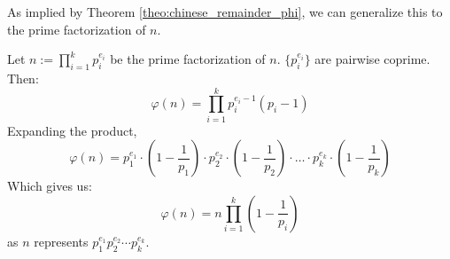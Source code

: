 \noindent
As implied by Theorem \ref{theo:chinese_remainder_phi}, we can generalize this to the prime factorization of $n$.
\begin{theo}

    Let $n:=\prod_{i=1}^k p_i^{e_i}$ be the prime factorization of $n$. $\{p_{i}^{e_i}\}$ are pairwise coprime. Then:
    \[\varphi(n)=\prod_{i=1}^k p_i^{e_i-1}(p_i-1)\]
    Expanding the product, 
    \[
\varphi(n) = p_1^{e_1} \cdot \left( 1 - \frac{1}{p_1} \right) \cdot p_2^{e_2} \cdot \left( 1 - \frac{1}{p_2} \right) \cdot \dots \cdot p_k^{e_k} \cdot \left( 1 - \frac{1}{p_k} \right)
\]
\noindent
Which gives us:
    \[\varphi(n)=n\prod_{i=1}^k\left(1-\frac{1}{p_i}\right)\]
\noindent
as $n$ represents $p_1^{e_1}p_2^{e_2}\cdots p_k^{e_k}$.
\end{theo}
    
    